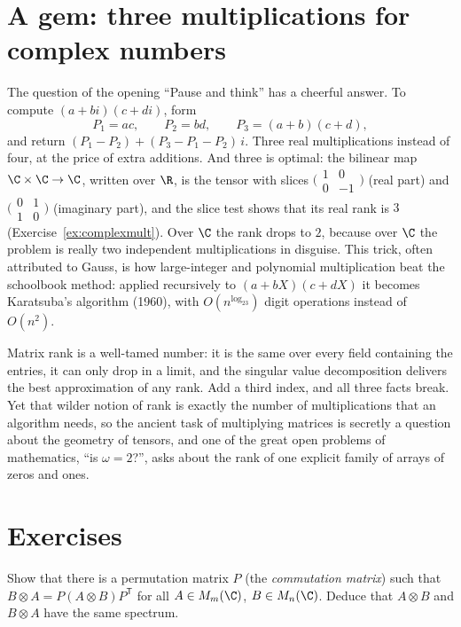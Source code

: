 \section{A gem: three multiplications for complex numbers}

The question of the opening ``Pause and think'' has a cheerful answer. To compute $(a+bi)(c+di)$, form
\[
P_1=ac,\qquad P_2=bd,\qquad P_3=(a+b)(c+d),
\]
and return $(P_1-P_2)+(P_3-P_1-P_2)\,i$. Three real multiplications instead of four, at the price of extra additions. And three is
optimal: the bilinear map $\C\times\C\to\C$, written over $\R$, is the tensor with slices $\bigl(\begin{smallmatrix}1&0\\0&-1\end{smallmatrix}
\bigr)$ (real part) and $\bigl(\begin{smallmatrix}0&1\\1&0\end{smallmatrix}\bigr)$ (imaginary part), and the slice test shows that its
real rank is $3$ (Exercise~\ref{ex:complexmult}). Over $\C$ the rank drops to $2$, because over $\C$ the problem is really two
independent multiplications in disguise. This trick, often attributed to Gauss, is how large-integer and polynomial
multiplication beat the schoolbook method: applied recursively to $(a+bX)(c+dX)$ it becomes Karatsuba's algorithm (1960), with
$O(n^{\log_23})$ digit operations instead of $O(n^2)$.

\begin{beauty}
Matrix rank is a well-tamed number: it is the same over every field containing the entries, it can only drop in a limit, and the
singular value decomposition delivers the best approximation of any rank. Add a third index, and all three facts break. Yet
that wilder notion of rank is exactly the number of multiplications that an algorithm needs, so the ancient task of multiplying
matrices is secretly a question about the geometry of tensors, and one of the great open problems of mathematics, ``is $\omega=2$?'',
asks about the rank of one explicit family of arrays of zeros and ones.
\end{beauty}

\section{Exercises}

\begin{exercise}[$\star$]\label{ex:kroncommute}
Show that there is a permutation matrix $P$ (the \emph{commutation matrix}) such that $B\otimes A=P(A\otimes B)P^{\mathsf T}$ for all
$A\in M_m(\C)$, $B\in M_n(\C)$. Deduce that $A\otimes B$ and $B\otimes A$ have the same spectrum.
\end{exercise}

